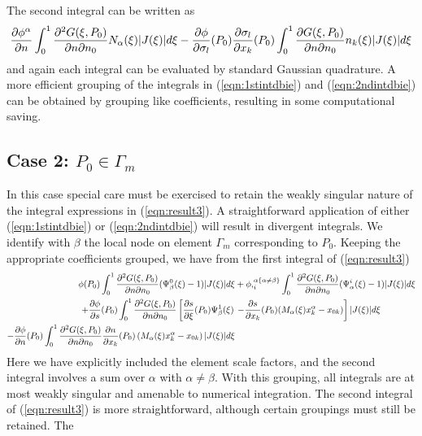 The second integral can be written as
\begin{equation}
  \dfrac{\partial \phi^{\alpha}}{\partial n} \int_{0}^{1}\frac{\partial^{2}G(\xi,P_{0})}
  {\partial n\partial n_{0}}N_{\alpha}(\xi)|J(\xi)|d\xi - 
   \dfrac{\partial \phi}{\partial \sigma_{l}} (P_{0}) \dfrac{\partial \sigma_{l}}{\partial x_{k}} (P_{0})
   \int_{0}^{1}\frac{\partial G(\xi,P_{0})}{\partial n\partial n_{0}}
   n_{k}(\xi)|J(\xi)|d\xi
 \label{eqn:2ndintdbie}
\end{equation}
and again each integral can be evaluated by standard Gaussian quadrature.  A
more efficient grouping of the integrals in (\ref{eqn:1stintdbie}) and
(\ref{eqn:2ndintdbie}) can be obtained by grouping like coefficients, resulting in
some computational saving.

\subsection*{Case 2:  $P_{0}\in \Gamma_{m}$} 
In this case special care must be exercised to retain the weakly singular
nature of the integral expressions in (\ref{eqn:result3}).  A straightforward
application of either (\ref{eqn:1stintdbie}) or (\ref{eqn:2ndintdbie}) will result in
divergent integrals.  We identify with $\beta$ the local node on element
$\Gamma_{m}$ corresponding to $P_{0}$.  Keeping the appropriate coefficients
grouped, we have from the first integral of (\ref{eqn:result3})
\begin{eqnarray}
 \phi(P_{0})\int_{0}^{1}\frac{\partial^{2}G(\xi,P_{0})}
  {\partial n\partial n_{0}}(\Psi_{\beta}^{0}(\xi)-1)|J(\xi)|d\xi & + 
  \phi ,_{i}^{\alpha\{\alpha\neq\beta\}}\int_{0}^{1}
  \frac{\partial^{2}G(\xi,P_{0})}
  {\partial n\partial n_{0}}(\Psi_{\alpha}^{i}(\xi)-1)|J(\xi)|d\xi\nonumber\\
 + \dfrac{\partial \phi}{\partial s} (P_{0})\int_{0}^{1}\frac{\partial^{2}G(\xi,P_{0})}
  {\partial n\partial n_{0}}\left[ \dfrac{\partial s}{\partial \xi} (P_{0})\Psi_{\beta}^{1}(\xi)\right.
 & \left.-  \dfrac{\partial s}{\partial x_{k}} (P_{0})(M_{\alpha}(\xi)x_{k}^{\alpha}-x_{0k})\right]
 |J(\xi)|d\xi\nonumber\\
 - \dfrac{\partial \phi}{\partial n} (P_{0})\int_{0}^{1}\frac{\partial^{2}G(\xi,P_{0})}
  {\partial n\partial n_{0}} \dfrac{\partial n}{\partial x_{k}} (P_{0})
  \left(M_{\alpha}(\xi)x_{k}^{\alpha}-x_{0k}\right)|J(\xi)|d\xi
 \label{eqn:from1stintdbie}
\end{eqnarray}
Here we have explicitly included the element scale factors, and the second
integral involves a sum over $\alpha$ with $\alpha\neq\beta$.  With this
grouping, all integrals are at most weakly singular and amenable to numerical
integration.  The second integral of (\ref{eqn:result3}) is more
straightforward, although certain groupings must still be retained.  The
